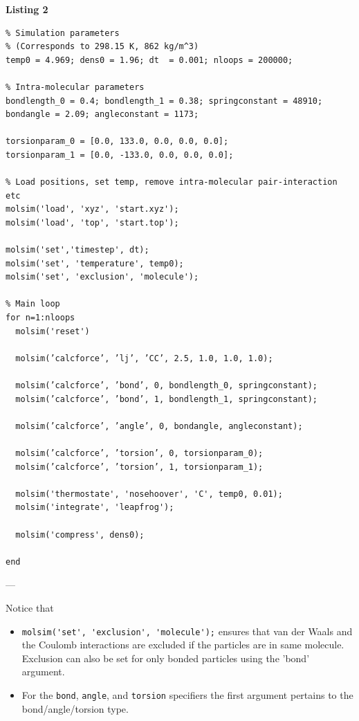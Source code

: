 \documentclass[11pt]{article}
\begin{document}
\noindent \textbf{Listing 2}
\begin{verbatim}
% Simulation parameters 
% (Corresponds to 298.15 K, 862 kg/m^3)
temp0 = 4.969; dens0 = 1.96; dt  = 0.001; nloops = 200000;

% Intra-molecular parameters
bondlength_0 = 0.4; bondlength_1 = 0.38; springconstant = 48910;
bondangle = 2.09; angleconstant = 1173;

torsionparam_0 = [0.0, 133.0, 0.0, 0.0, 0.0]; 
torsionparam_1 = [0.0, -133.0, 0.0, 0.0, 0.0];

% Load positions, set temp, remove intra-molecular pair-interaction etc
molsim('load', 'xyz', 'start.xyz');
molsim('load', 'top', 'start.top');

molsim('set','timestep', dt);
molsim('set', 'temperature', temp0);
molsim('set', 'exclusion', 'molecule');

% Main loop
for n=1:nloops
  molsim('reset')

  molsim(’calcforce’, ’lj’, ’CC’, 2.5, 1.0, 1.0, 1.0);
  
  molsim(’calcforce’, ’bond’, 0, bondlength_0, springconstant);
  molsim(’calcforce’, ’bond’, 1, bondlength_1, springconstant);
  
  molsim(’calcforce’, ’angle’, 0, bondangle, angleconstant);

  molsim(’calcforce’, ’torsion’, 0, torsionparam_0);
  molsim(’calcforce’, ’torsion’, 1, torsionparam_1);
  
  molsim('thermostate', 'nosehoover', 'C', temp0, 0.01);
  molsim('integrate', 'leapfrog');

  molsim('compress', dens0);

end
\end{verbatim}

\noindent ---

\noindent Notice that
\begin{itemize}
\item \verb!molsim('set', 'exclusion', 'molecule');! ensures that van
  der Waals and the Coulomb interactions are excluded if the particles
  are in same molecule. Exclusion can also be set for only bonded particles
  using the 'bond' argument.
\item For the \verb!bond!, \verb!angle!, and \verb!torsion! specifiers the first
  argument pertains to the bond/angle/torsion type.  
\end{itemize}
\end{document}

